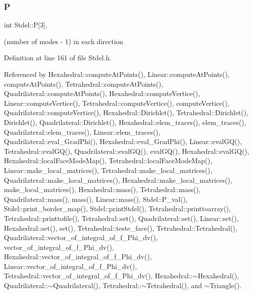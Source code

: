 \mbox{\label{classStdel_a05cbb3f2a3fa0bc04a74e347dc6574cf}} 
\subsubsection{\texorpdfstring{P}{P}}
{\footnotesize\ttfamily int Stdel\+::P\mbox{[}3\mbox{]}\hspace{0.3cm}{\ttfamily [protected]}, {\ttfamily [inherited]}}



(number of modes -\/ 1) in each direction 



Definition at line 161 of file Stdel.\+h.



Referenced by Hexahedral\+::compute\+At\+Points(), Linear\+::compute\+At\+Points(), compute\+At\+Points(), Tetrahedral\+::compute\+At\+Points(), Quadrilateral\+::compute\+At\+Points(), Hexahedral\+::compute\+Vertice(), Linear\+::compute\+Vertice(), Tetrahedral\+::compute\+Vertice(), compute\+Vertice(), Quadrilateral\+::compute\+Vertice(), Hexahedral\+::\+Dirichlet(), Tetrahedral\+::\+Dirichlet(), Dirichlet(), Quadrilateral\+::\+Dirichlet(), Hexahedral\+::elem\+\_\+traces(), elem\+\_\+traces(), Quadrilateral\+::elem\+\_\+traces(), Linear\+::elem\+\_\+traces(), Quadrilateral\+::eval\+\_\+\+Grad\+Phi(), Hexahedral\+::eval\+\_\+\+Grad\+Phi(), Linear\+::eval\+G\+Q(), Tetrahedral\+::eval\+G\+Q(), Quadrilateral\+::eval\+G\+Q(), eval\+G\+Q(), Hexahedral\+::eval\+G\+Q(), Hexahedral\+::local\+Face\+Mode\+Map(), Tetrahedral\+::local\+Face\+Mode\+Map(), Linear\+::make\+\_\+local\+\_\+matrices(), Tetrahedral\+::make\+\_\+local\+\_\+matrices(), Quadrilateral\+::make\+\_\+local\+\_\+matrices(), Hexahedral\+::make\+\_\+local\+\_\+matrices(), make\+\_\+local\+\_\+matrices(), Hexahedral\+::mass(), Tetrahedral\+::mass(), Quadrilateral\+::mass(), mass(), Linear\+::mass(), Stdel\+::\+P\+\_\+val(), Stdel\+::print\+\_\+border\+\_\+map(), Stdel\+::print\+Stdel(), Tetrahedral\+::printtoarray(), Tetrahedral\+::printtofile(), Tetrahedral\+::set(), Quadrilateral\+::set(), Linear\+::set(), Hexahedral\+::set(), set(), Tetrahedral\+::teste\+\_\+face(), Tetrahedral\+::\+Tetrahedral(), Quadrilateral\+::vector\+\_\+of\+\_\+integral\+\_\+of\+\_\+f\+\_\+\+Phi\+\_\+dv(), vector\+\_\+of\+\_\+integral\+\_\+of\+\_\+f\+\_\+\+Phi\+\_\+dv(), Hexahedral\+::vector\+\_\+of\+\_\+integral\+\_\+of\+\_\+f\+\_\+\+Phi\+\_\+dv(), Linear\+::vector\+\_\+of\+\_\+integral\+\_\+of\+\_\+f\+\_\+\+Phi\+\_\+dv(), Tetrahedral\+::vector\+\_\+of\+\_\+integral\+\_\+of\+\_\+f\+\_\+\+Phi\+\_\+dv(), Hexahedral\+::$\sim$\+Hexahedral(), Quadrilateral\+::$\sim$\+Quadrilateral(), Tetrahedral\+::$\sim$\+Tetrahedral(), and $\sim$\+Triangle().

